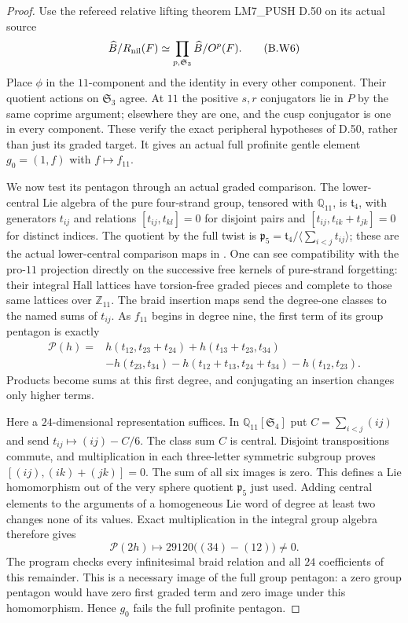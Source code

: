\begin{proof}
Use the refereed relative lifting theorem LM7\_PUSH D.50
on its actual source
\[
 \widehat B/R_{\rm nil}(F)
   \simeq\prod_{p,\mathfrak S_3}\widehat B/O^p(F).
 \tag{B.W6}
\]
Place $\phi$ in the $11$-component and the identity in
every other component. Their quotient actions on
$\mathfrak S_3$ agree. At $11$ the positive $s,r$
conjugators lie in $P$ by the same coprime argument;
elsewhere they are one, and the cusp conjugator is one
in every component. These verify the exact peripheral
hypotheses of D.50, rather than just its graded target.
It gives an actual full profinite gentle element
$g_0=(1,f)$ with $f\mapsto f_{11}$.

We now test its pentagon through an actual graded
comparison. The lower-central Lie algebra of the pure
four-strand group, tensored with $\mathbb Q_{11}$,
is $\mathfrak t_4$, with generators $t_{ij}$ and
relations
$[t_{ij},t_{kl}]=0$ for disjoint pairs and
$[t_{ij},t_{ik}+t_{jk}]=0$ for distinct indices.
The quotient by the full twist is
$\mathfrak p_5=\mathfrak t_4/\langle\sum_{i<j}t_{ij}\rangle$;
these are the actual lower-central comparison maps in
\cite[Section 5.1.1 and Remark 5.1]{EnriquezFurusho2021}.
One can see compatibility with the pro-$11$ projection
directly on the successive free kernels of pure-strand
forgetting: their integral Hall lattices have torsion-free
graded pieces and complete to those same lattices over
$\mathbb Z_{11}$. The braid insertion maps send the
degree-one classes to the named sums of $t_{ij}$.
As $f_{11}$ begins in degree nine, the first term of
its group pentagon is exactly
\[
\begin{split}
 \mathcal P(h)={}&h(t_{12},t_{23}+t_{24})
                 +h(t_{13}+t_{23},t_{34})\\
 &-h(t_{23},t_{34})
   -h(t_{12}+t_{13},t_{24}+t_{34})
   -h(t_{12},t_{23}).                                    
\end{split}\tag{B.W7}
\]
Products become sums at this first degree, and conjugating
an insertion changes only higher terms.

Here a $24$-dimensional representation suffices. In
$\mathbb Q_{11}[\mathfrak S_4]$ put
$C=\sum_{i<j}(ij)$ and send
$t_{ij}\mapsto(ij)-C/6$. The class sum $C$ is central.
Disjoint transpositions commute, and multiplication in
each three-letter symmetric subgroup proves
$[(ij),(ik)+(jk)]=0$. The sum of all six images is zero.
This defines a Lie homomorphism out of the very sphere
quotient $\mathfrak p_5$ just used. Adding central
elements to the arguments of a homogeneous Lie word
of degree at least two changes none of its values.
Exact multiplication in the integral group algebra
therefore gives
\[
          \mathcal P(2h)\longmapsto
                    29120\bigl((34)-(12)\bigr)\ne0.
 \tag{B.W8}
\]
The program checks every infinitesimal braid relation
and all $24$ coefficients of this remainder.
This is a necessary image of the full group pentagon:
a zero group pentagon would have zero first graded
term and zero image under this homomorphism. Hence
$g_0$ fails the full profinite pentagon.


\end{proof}
